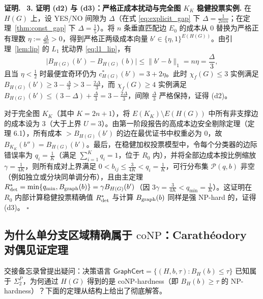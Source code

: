 \documentclass[11pt,a4paper]{ctexart}
\theoremstyle{definition}
\newenvironment{proofcn}{\par\noindent\textbf{证明.}\ }{\hfill$\square$\par}
\newcommand{\GraphCert}{\mathsf{GraphCert}}
\newcommand{\1}{\boldsymbol 1}
\newcommand{\0}{\boldsymbol 0}
\newcommand{\bgraph}{B_{\rm graph}}
\newcommand{\chif}{\chi_f}
\begin{document}
\begin{proofcn}
\medskip
\noindent\textbf{3. 证明 (d2) 与 (d3)：严格正成本扰动与完全图 $K_K$ 稳健投票实例.}
在 $H(G)$ 上，设 YES/NO 间隙为 $\Delta$（在式 \eqref{eq:explicit_gap} 下 $\Delta=\frac{1}{2mn}$；在定理~\ref{thm:const_gap} 下 $\Delta=\frac{1}{5}$）。将 $n$ 条垂直匹配边 $E_0$ 的成本从 $0$ 替换为严格正有理数 $\eta:=\frac{\Delta}{3n}>0$，得到严格正两级成本向量 $b'\in\{\eta,1\}^{E(H(G))}$。由引理~\ref{lem:lip} 的 $L_1$ 扰动界 \eqref{eq:l1_lip}，有
\[
 \bigl|B_{H(G)}(b')-B_{H(G)}(b)\bigr|\le \|b'-b\|_1 = n\eta = \frac{\Delta}{3},
\]
且当 $\eta<\frac{1}{2}$ 时最便宜奇环仍为 $c_{H(G)}^*(b')=3+2\eta$。此时 $\chif(G)\le 3$ 实例满足 $B_{H(G)}(b')\ge 3-\frac{\Delta}{3}>3-\frac{2\Delta}{3}$，而 $\chif(G)\ge 4$ 实例满足 $B_{H(G)}(b')\le (3-\Delta)+\frac{\Delta}{3}=3-\frac{2\Delta}{3}$，间隙 $\frac{\Delta}{3}$ 严格保持，证得 (d2)。

对于完全图 $K_K$（其中 $K=2n+1$），将 $E(K_K)\setminus E(H(G))$ 中所有非支撑边的成本设为 $3$（大于上界 $U=3$）。由第一阶段报告的高成本边安全剔除定理（定理 6.1），所有成本 $>B_{H(G)}(b')$ 的边在最优证书中权重必为 $0$，故 $B_{K_K}(b'')=B_{H(G)}(b')$。最后，在稳健加权投票模型中，令每个分类器的边际错误率为 $q_i=\frac{1}{K}$（满足 $\sum_{i=1}^K q_i=1$，位于 $R_0$ 内），并将全部边成本按比例缩放 $\gamma=\frac{1}{4K}$，则所有成对上界满足 $0<b_{ij}\le \frac{3}{4K}<q_i=\frac{1}{K}$，可行分布集 $\mathcal P(q,b)$ 非空（例如独立或分块同单调分布），且由主定理 $R_{\rm det}^*=\min\{q_{\min},\bgraph(b)\}=\gamma B_{H(G)}(b')$（因 $3\gamma=\frac{3}{4K}<q_{\min}=\frac{1}{K}$）。这证明在 $R_0$ 内部计算稳健投票精确值 $R_{\rm det}^*$ 与计算 $\bgraph(b)$ 同样是强 NP-hard 的，证得 (d3)。
\end{proofcn}

\subsection{为什么单分支区域精确属于 $\mathrm{coNP}$：Carath\'eodory 对偶见证定理}
交接备忘录曾提出疑问：决策语言 $\GraphCert=\{(H,b,\tau):B_H(b)\le\tau\}$ 已知属于 $\Sigma_2^P$，为何通过 $H(G)$ 得到的是 $\mathrm{coNP}$-hardness（即 $B_H(b)\ge\tau$ 的 $\mathrm{NP}$-hardness）？下面的定理从结构上给出了彻底解答。
\end{document}
